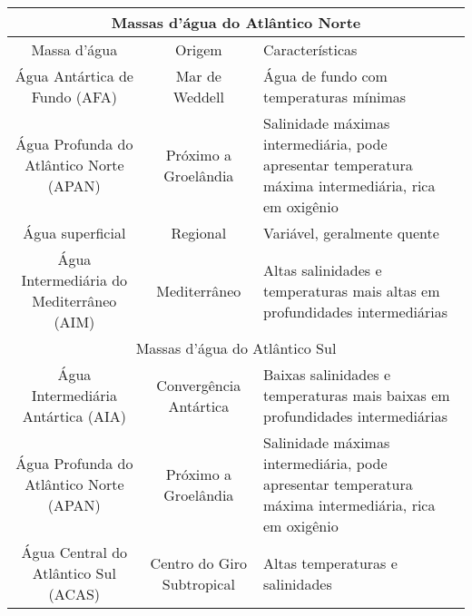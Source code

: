 \documentclass[a4paper,10pt]{article}
\begin{document}
\begin{center}
  \begin{tabular}{|c|c|p{6cm}|}
    \hline
        \multicolumn{3}{|c|}{Massas d'água do Atlântico Norte} \\
    \hline          
    Massa d'água                       & Origem & Características    \\ \hline
    Água Antártica de Fundo (AFA)      & Mar de Weddell        & Água de fundo com temperaturas mínimas \\ \hline
    Água Profunda do Atlântico Norte (APAN)   & Próximo a Groelândia  & Salinidade máximas intermediária, pode apresentar temperatura máxima intermediária, rica em oxigênio \\ \hline
    Água superficial                   & Regional              & Variável, geralmente quente \\ \hline
    Água Intermediária do Mediterrâneo (AIM) & Mediterrâneo          & Altas salinidades e temperaturas mais altas em profundidades intermediárias \\ \hline
    \multicolumn{3}{|c|}{Massas d'água do Atlântico Sul} \\ \hline
    Água Intermediária Antártica (AIA)      & Convergência Antártica   & Baixas salinidades e temperaturas mais baixas em profundidades intermediárias \\ \hline
     Água Profunda do Atlântico Norte (APAN)   & Próximo a Groelândia  & Salinidade máximas intermediária, pode apresentar temperatura máxima intermediária, rica em oxigênio \\ \hline
     Água Central do Atlântico Sul (ACAS)  & Centro do Giro Subtropical  & Altas temperaturas e salinidades \\ 
    \hline
  \end{tabular}
\end{center}  
  
  
  
  
  
\def\width{8}
\def\hauteur{10}
\end{document}
